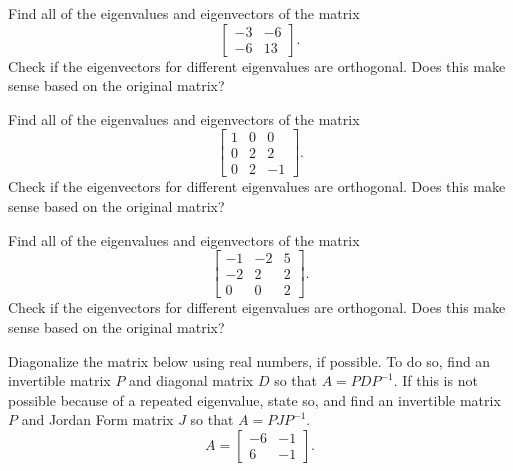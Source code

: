 \begin{exercise}
Find all of the eigenvalues and eigenvectors of the matrix
\[ \begin{bmatrix}-3 & -6 \\ -6 & 13 \end{bmatrix}. \]
Check if the eigenvectors for different eigenvalues are orthogonal. Does this make sense based on the original matrix?
\end{exercise}

\begin{exercise}\ansMark%
Find all of the eigenvalues and eigenvectors of the matrix
\[ \begin{bmatrix}1 & 0 & 0 \\ 0 & 2 & 2 \\ 0 & 2 & -1 \end{bmatrix}. \]
Check if the eigenvectors for different eigenvalues are orthogonal. Does this make sense based on the original matrix?
\end{exercise}
%

\begin{exercise}
Find all of the eigenvalues and eigenvectors of the matrix
\[ \begin{bmatrix} -1 & -2 & 5 \\ -2 & 2 & 2 \\ 0 & 0 & 2 \end{bmatrix}. \]
Check if the eigenvectors for different eigenvalues are orthogonal. Does this make sense based on the original matrix?
\end{exercise}

\begin{exercise}
Diagonalize the matrix below using real numbers, if possible. To do so, find an invertible matrix $P$ and diagonal matrix $D$ so that $A = PDP^{-1}$. If this is not possible because of a repeated eigenvalue, state so, and find an invertible matrix $P$ and Jordan Form matrix $J$ so that $A = PJP^{-1}$. 
\[ A = \begin{bmatrix} -6 & -1 \\ 6 & -1 \end{bmatrix}.\]
\end{exercise} 

